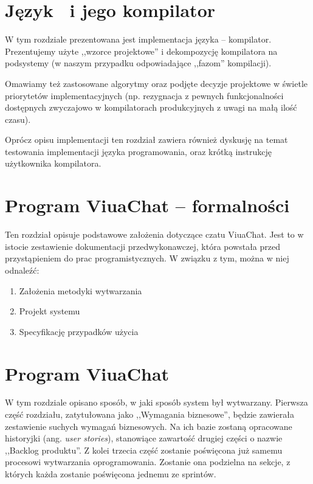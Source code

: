 \documentclass[11pt,oneside,a4paper,titlepage,onecolumn]{book}
\begin{document}
\section{Język \ViuAct\ i jego kompilator}

W tym rozdziale prezentowana jest implementacja języka \ViuAct -- kompilator. Prezentujemy użyte ,,wzorce
projektowe'' i dekompozycję kompilatora na podsystemy (w naszym przypadku odpowiadające ,,fazom'' kompilacji).

Omawiamy też zastosowane algorytmy oraz podjęte decyzje projektowe w świetle priorytetów implementacyjnych
(np. rezygnacja z pewnych funkcjonalności dostępnych zwyczajowo w kompilatorach produkcyjnych z uwagi na małą
ilość czasu).

Oprócz opisu implementacji ten rozdział zawiera również dyskusję na temat testowania implementacji języka
programowania, oraz krótką instrukcję użytkownika kompilatora.


\section{Program ViuaChat -- formalności}

Ten rozdział opisuje podstawowe założenia dotyczące
czatu ViuaChat. Jest to w istocie zestawienie dokumentacji przedwykonawczej, która powstała przed przystąpieniem do prac programistycznych. W związku z tym, można w niej odnaleźć:
\begin{enumerate}
  \item Założenia metodyki wytwarzania
  \item Projekt systemu
  \item Specyfikację przypadków użycia
\end{enumerate}

\section{Program ViuaChat}

W tym rozdziale opisano sposób, w jaki sposób system był wytwarzany. Pierwsza część rozdziału, zatytułowana jako ,,Wymagania biznesowe'', będzie zawierała zestawienie suchych wymagań biznesowych. Na ich bazie zostaną opracowane historyjki (ang. \textit{user stories}), stanowiące zawartość drugiej części o nazwie ,,Backlog produktu''. Z kolei trzecia część zostanie poświęcona już samemu procesowi wytwarzania oprogramowania. Zostanie ona podzielna na sekcje, z których każda zostanie poświęcona jednemu ze sprintów.
\end{document}
